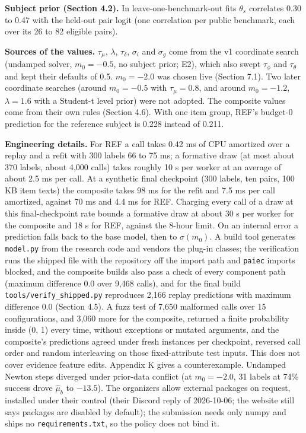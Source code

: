 \documentclass[
]{article}
\begin{document}
\textbf{Subject prior (Section 4.2).} In leave-one-benchmark-out fits
\(\theta_s\) correlates 0.30 to 0.47 with the held-out pair logit (one
correlation per public benchmark, each over its 26 to 82 eligible
pairs).

\textbf{Sources of the values.} \(\tau_\mu\), \(\lambda\),
\(\tau_\delta\), \(\sigma_i\) and \(\sigma_g\) come from the v1
coordinate search (undamped solver, \(m_0 = -0.5\), no subject prior;
E2), which also swept \(\tau_\phi\) and \(\tau_\theta\) and kept their
defaults of 0.5. \(m_0 = -2.0\) was chosen live (Section 7.1). Two later
coordinate searches (around \(m_0 = -0.5\) with \(\tau_\mu = 0.8\), and
around \(m_0 = -1.2\), \(\lambda = 1.6\) with a Student-t level prior)
were not adopted. The composite values come from their own rules
(Section 4.6). With one item group, REF's budget-0 prediction for the
reference subject is 0.228 instead of 0.211.

\textbf{Engineering details.} For REF a call takes 0.42 ms of CPU
amortized over a replay and a refit with 300 labels 66 to 75 ms; a
formative draw (at most about 370 labels, about 4,000 calls) takes
roughly 10 s per worker at an average of about 2.5 ms per call. At a
synthetic final checkpoint (300 labels, ten pairs, 100 KB item texts)
the composite takes 98 ms for the refit and 7.5 ms per call amortized,
against 70 ms and 4.4 ms for REF. Charging every call of a draw at this
final-checkpoint rate bounds a formative draw at about 30 s per worker
for the composite and 18 s for REF, against the 8-hour limit. On an
internal error a prediction falls back to the base model, then to
\(\sigma(m_0)\). A build tool generates \texttt{model.py} from the
research code and vendors the plug-in classes; the verification runs the
shipped file with the repository off the import path and \texttt{paiec}
imports blocked, and the composite builds also pass a check of every
component path (maximum difference 0.0 over 9,468 calls), and for the
final build \texttt{tools/verify\_shipped.py} reproduces 2,166 replay
predictions with maximum difference 0.0 (Section 4.5). A fuzz test of
7,650 malformed calls over 15 configurations, and 3,060 more for the
composite, returned a finite probability inside (0, 1) every time,
without exceptions or mutated arguments, and the composite's predictions
agreed under fresh instances per checkpoint, reversed call order and
random interleaving on those fixed-attribute test inputs. This does not
cover evidence feature edits. Appendix K gives a counterexample.
Undamped Newton steps diverged under prior-data conflict (at
\(m_0 = -2.0\), 31 labels at 74\% success drove \(\hat\mu_b\) to
\(-13.5\)). The organizers allow external packages on request, installed
under their control (their Discord reply of 2026-10-06; the website
still says packages are disabled by default); the submission needs only
numpy and ships no \texttt{requirements.txt}, so the policy does not
bind it.
\end{document}

